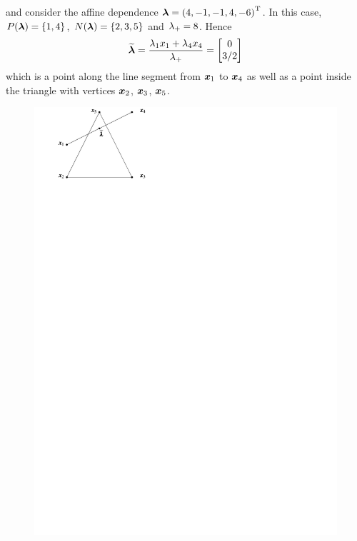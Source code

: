 \begin{Example}
        and consider the affine dependence \(\bm{\lambda}={(4,-1,-1,4,-6)}^{\mathrm{T}}\).  In this case, \(P(\bm{\lambda})=\left\{1,4\right\}\), \(N(\bm{\lambda})=\left\{2,3,5\right\}\) and \(\lambda_+=8\).
        Hence
            \[
                \widetilde{\bm{\lambda}}
                    =   \frac{\lambda_1x_1+\lambda_4x_4}{\lambda_+}
                    =   \begin{bmatrix}
                            0\\ 3/2
                        \end{bmatrix}
            \]
        which is a point along the line segment from \(\bm{x}_1\) to \(\bm{x}_4\) as well as a point inside the triangle with vertices \(\bm{x}_2\), \(\bm{x}_3\), \(\bm{x}_5\).
            \begin{figure}[h!]
                \centering
                    \includegraphics[page=1, width=.3\textwidth]{pictures.pdf}
            \end{figure}


\end{Example}
